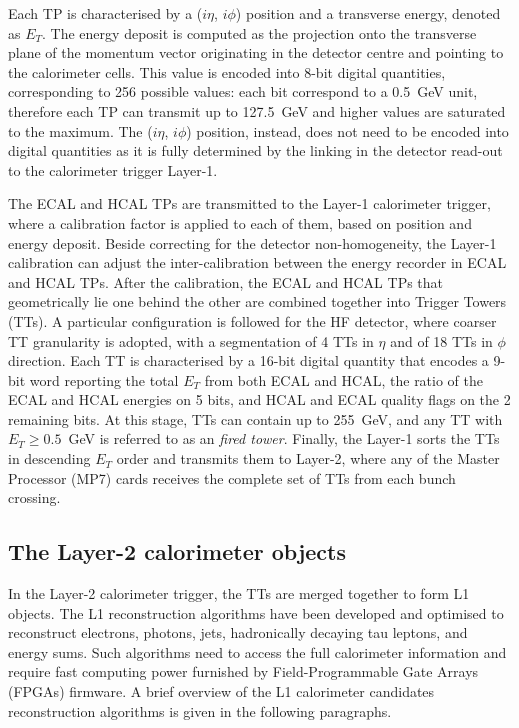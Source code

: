 \bigbreak

Each TP is characterised by a ($i\eta$, $i\phi$) position and a transverse energy, denoted as $E_T$.
The energy deposit is computed as the projection onto the transverse plane of the momentum vector originating in the detector centre and pointing to the calorimeter cells. This value is encoded into 8-bit digital quantities, corresponding to 256 possible values: each bit correspond to a 0.5~GeV unit, therefore each TP can transmit up to 127.5~GeV and higher values are saturated to the maximum.
The ($i\eta$, $i\phi$) position, instead, does not need to be encoded into digital quantities as it is fully determined by the linking in the detector read-out to the calorimeter trigger Layer-1.

The ECAL and HCAL TPs are transmitted to the Layer-1 calorimeter trigger, where a calibration factor is applied to each of them, based on position and energy deposit. Beside correcting for the detector non-homogeneity, the Layer-1 calibration can adjust the inter-calibration between the energy recorder in ECAL and HCAL TPs.
After the calibration, the ECAL and HCAL TPs that geometrically lie one behind the other are combined together into Trigger Towers (TTs).
A particular configuration is followed for the HF detector, where coarser TT granularity is adopted, with a segmentation of 4 TTs in $\eta$ and of 18 TTs in $\phi$ direction. 
Each TT is characterised by a 16-bit digital quantity that encodes a 9-bit word reporting the total $E_T$ from both ECAL and HCAL, the ratio of the ECAL and HCAL energies on 5 bits, and HCAL and ECAL quality flags on the 2 remaining bits.
At this stage, TTs can contain up to 255~GeV, and any TT with $E_T \geq 0.5$~GeV is referred to as an \textit{fired tower}. 
Finally, the Layer-1 sorts the TTs in descending $E_T$ order and transmits them to Layer-2, where any of the Master Processor (MP7) cards receives the complete set of TTs from each bunch crossing. 

\subsection{The Layer-2 calorimeter objects}
\label{subsec:The Layer-2 calorimeter objects}

In the Layer-2 calorimeter trigger, the TTs are merged together to form L1 objects. The L1 reconstruction algorithms have been developed and optimised to reconstruct electrons, photons, jets, hadronically decaying tau leptons, and energy sums.
Such algorithms need to access the full calorimeter information and require fast computing power furnished by Field-Programmable Gate Arrays (FPGAs) firmware.
A brief overview of the L1 calorimeter candidates reconstruction algorithms is given in the following paragraphs.

